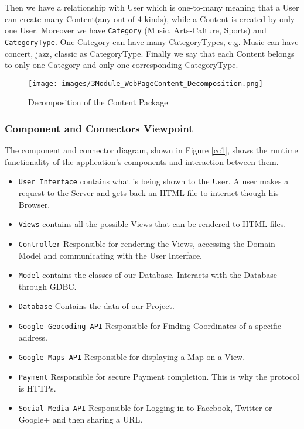 Then we have a relationship with User which is one-to-many meaning that a User can create many Content(any out of 4 kinds), while a Content is created by only one User. Moreover we have \verb|Category| (Music, Arts-Calture, Sports) and \verb|CategoryType|. One Category can have many CategoryTypes, e.g. Music can have concert, jazz, classic as CategoryType. Finally we say that each Content belongs to only one Category and only one corresponding CategoryType.

\begin{figure}[H]
	\centering
	\texttt{[image: images/3Module\_WebPageContent\_Decomposition.png]}
	\caption{Decomposition of the Content Package}
	\label{moduleView3}
\end{figure}







\subsubsection{Component and Connectors Viewpoint}

The component and connector diagram, shown in Figure \ref{cc1}, shows the runtime functionality of the application’s components and interaction between them.

\begin{itemize}
		\item \verb|User Interface| contains what is being shown to the User. A user makes a request to the Server and gets back an HTML file to interact though his Browser.
		\item \verb|Views| contains all the possible Views that can be rendered to HTML files.
		\item \verb|Controller| Responsible for rendering the Views, accessing the Domain Model and communicating with the User Interface. 
		\item \verb|Model| contains the classes of our Database. Interacts with the Database through GDBC.
		\item \verb|Database| Contains the data of our Project.
		\item \verb|Google Geocoding API| Responsible for Finding Coordinates of a specific address.
		\item \verb|Google Maps API| Responsible for displaying a Map on a View.
		\item \verb|Payment| Responsible for secure Payment completion. This is why the protocol is HTTPs.
		\item \verb|Social Media API| Responsible for Logging-in to Facebook, Twitter or Google+ and then sharing a URL.
\end{itemize}


